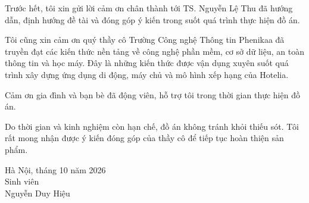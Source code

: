 
Trước hết, tôi xin gửi lời cảm ơn chân thành tới TS. Nguyễn Lệ Thu đã hướng dẫn, định hướng đề tài và đóng góp ý kiến trong suốt quá trình thực hiện đồ án.

Tôi cũng xin cảm ơn quý thầy cô Trường Công nghệ Thông tin Phenikaa đã truyền đạt các kiến thức nền tảng về công nghệ phần mềm, cơ sở dữ liệu, an toàn thông tin và học máy. Đây là những kiến thức được vận dụng xuyên suốt quá trình xây dựng ứng dụng di động, máy chủ và mô hình xếp hạng của Hotelia.

Cảm ơn gia đình và bạn bè đã động viên, hỗ trợ tôi trong thời gian thực hiện đồ án.

Do thời gian và kinh nghiệm còn hạn chế, đồ án không tránh khỏi thiếu sót. Tôi rất mong nhận được ý kiến đóng góp của thầy cô để tiếp tục hoàn thiện sản phẩm.

\vspace{1cm}
\begin{flushright}
\begin{minipage}{7.5cm}
\centering
Hà Nội, tháng 10 năm 2026\\
Sinh viên\\[2.2cm]
Nguyễn Duy Hiệu
\end{minipage}
\end{flushright}
